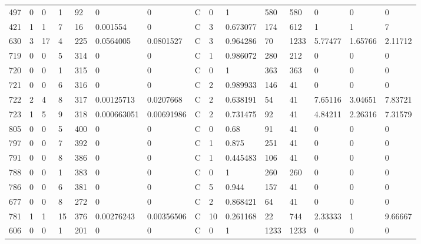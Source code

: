 \begin{latin}
\begin{longtable}{lllllllllllllll}
	497 & 0  & 0   & 1  & 92  & 0              & 0              & C & 0  & 1        & 580  & 580  & 0       & 0       & 0       \\
	421 & 1  & 1   & 7  & 16  & 0.001554       & 0              & C & 3  & 0.673077 & 174  & 612  & 1       & 1       & 7       \\
	630 & 3  & 17  & 4  & 225 & 0.0564005      & 0.0801527      & C & 3  & 0.964286 & 70   & 1233 & 5.77477 & 1.65766 & 2.11712 \\
	719 & 0  & 0   & 5  & 314 & 0              & 0              & C & 1  & 0.986072 & 280  & 212  & 0       & 0       & 0       \\
	720 & 0  & 0   & 1  & 315 & 0              & 0              & C & 0  & 1        & 363  & 363  & 0       & 0       & 0       \\
	721 & 0  & 0   & 6  & 316 & 0              & 0              & C & 2  & 0.989933 & 146  & 41   & 0       & 0       & 0       \\
	722 & 2  & 4   & 8  & 317 & 0.00125713     & 0.0207668      & C & 2  & 0.638191 & 54   & 41   & 7.65116 & 3.04651 & 7.83721 \\
	723 & 1  & 5   & 9  & 318 & 0.000663051    & 0.00691986     & C & 2  & 0.731475 & 92   & 41   & 4.84211 & 2.26316 & 7.31579 \\
	805 & 0  & 0   & 5  & 400 & 0              & 0              & C & 0  & 0.68     & 91   & 41   & 0       & 0       & 0       \\
	797 & 0  & 0   & 7  & 392 & 0              & 0              & C & 1  & 0.875    & 251  & 41   & 0       & 0       & 0       \\
	791 & 0  & 0   & 8  & 386 & 0              & 0              & C & 1  & 0.445483 & 106  & 41   & 0       & 0       & 0       \\
	788 & 0  & 0   & 1  & 383 & 0              & 0              & C & 0  & 1        & 260  & 260  & 0       & 0       & 0       \\
	786 & 0  & 0   & 6  & 381 & 0              & 0              & C & 5  & 0.944    & 157  & 41   & 0       & 0       & 0       \\
	677 & 0  & 0   & 8  & 272 & 0              & 0              & C & 2  & 0.868421 & 64   & 41   & 0       & 0       & 0       \\
	781 & 1  & 1   & 15 & 376 & 0.00276243     & 0.00356506     & C & 10 & 0.261168 & 22   & 744  & 2.33333 & 1       & 9.66667 \\
	606 & 0  & 0   & 1  & 201 & 0              & 0              & C & 0  & 1        & 1233 & 1233 & 0       & 0       & 0       \\

\end{longtable}
\end{latin}
